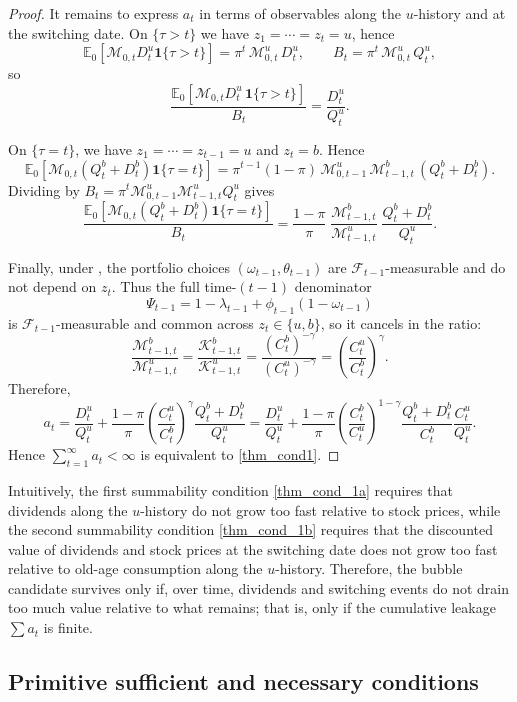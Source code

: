 \documentclass[12pt]{article}
\theoremstyle{plain}
\begin{document}
\begin{proof}
It remains to express $a_t$ in terms of observables along the $u$-history and at the switching date.
On $\{\tau>t\}$ we have $z_1=\cdots=z_t=u$, hence
\[
\mathbb E_0\!\left[\mathcal M_{0,t}D_t^u\mathbf 1\{\tau>t\}\right]
=\pi^t\,\mathcal M_{0,t}^u\,D_t^u,
\qquad
B_t=\pi^t\,\mathcal M_{0,t}^u\,Q_t^u,
\]
so
\[
\frac{\mathbb E_0[\mathcal M_{0,t}D_t^u\,\mathbf 1\{\tau>t\}]}{B_t}
=\frac{D_t^u}{Q_t^u}.
\]

On $\{\tau=t\}$, we have $z_1=\cdots=z_{t-1}=u$ and $z_t=b$. Hence
\[
\mathbb E_0\!\left[\mathcal M_{0,t}(Q_t^b+D_t^b)\mathbf 1\{\tau=t\}\right]
=\pi^{t-1}(1-\pi)\,\mathcal M_{0,t-1}^u\,\mathcal M_{t-1,t}^b\,(Q_t^b+D_t^b).
\]
Dividing by $B_t=\pi^{t}\mathcal M_{0,t-1}^u\mathcal M_{t-1,t}^u Q_t^u$ gives
\[
\frac{\mathbb E_0[\mathcal M_{0,t}(Q_t^b+D_t^b)\mathbf 1\{\tau=t\}]}{B_t}
=
\frac{1-\pi}{\pi}\;
\frac{\mathcal M_{t-1,t}^b}{\mathcal M_{t-1,t}^u}\;
\frac{Q_t^b+D_t^b}{Q_t^u}.
\]

Finally, under , the portfolio choices $(\omega_{t-1},\theta_{t-1})$ are $\mathcal F_{t-1}$-measurable and do not depend on $z_t$.
Thus the full time-$(t-1)$ denominator
\[
\Psi_{t-1}=1-\lambda_{t-1}+\phi_{t-1}(1-\omega_{t-1})
\]
is $\mathcal F_{t-1}$-measurable and common across $z_t\in\{u,b\}$, so it cancels in the ratio:
\[
\frac{\mathcal M_{t-1,t}^b}{\mathcal M_{t-1,t}^u}
=
\frac{\mathcal K_{t-1,t}^b}{\mathcal K_{t-1,t}^u}
=
\frac{(C_t^b)^{-\gamma}}{(C_t^u)^{-\gamma}}
=
\left(\frac{C_t^u}{C_t^b}\right)^{\gamma}.
\]
Therefore,
\[
a_t
=
\frac{D_t^u}{Q_t^u}
+\frac{1-\pi}{\pi}\left(\frac{C_t^u}{C_t^b}\right)^{\gamma}\frac{Q_t^b+D_t^b}{Q_t^u}
=
\frac{D_t^u}{Q_t^u}
+\frac{1-\pi}{\pi}
\left(\frac{C_t^b}{C_t^u}\right)^{1-\gamma}
\frac{Q_t^b+D_t^b}{C_t^b}\frac{C_t^u}{Q_t^u}.
\]
Hence $\sum_{t=1}^\infty a_t<\infty$ is equivalent to \eqref{thm_cond1}.
\end{proof}

Intuitively, the first summability condition \eqref{thm_cond_1a} requires that dividends along the $u$-history 
do not grow too fast relative to stock prices, while the second summability condition \eqref{thm_cond_1b} 
requires that the discounted value of dividends and stock prices at the switching date does not grow too 
fast relative to old-age consumption along the $u$-history. Therefore, the bubble candidate survives only if,
 over time, dividends and switching events do not drain too much value relative to what remains; that is, 
 only if the cumulative leakage $\sum a_t$ is finite.

\subsection{Primitive sufficient and necessary conditions}
\end{document}
